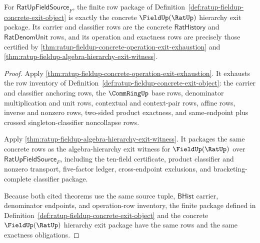 \begin{theorem}
\label{thm:ratup-fieldup-concrete-exit-object-hierarchy-exactness}
For $\mathsf{RatUpFieldSource}_F$, the finite row package of
Definition~\ref{def:ratup-fieldup-concrete-exit-object} is exactly the concrete
$\FieldUp(\RatUp)$ hierarchy exit package. Its carrier and classifier rows are
the concrete $\mathsf{RatHistory}$ and $\mathsf{RatDenomUnit}$ rows, and its
operation and exactness rows are precisely those certified by
\autoref{thm:ratup-fieldup-concrete-operation-exit-exhaustion} and
\autoref{thm:ratup-fieldup-algebra-hierarchy-exit-witness}.
\end{theorem}
\begin{proof}
Apply \autoref{thm:ratup-fieldup-concrete-operation-exit-exhaustion}. It
exhausts the row inventory of
Definition~\ref{def:ratup-fieldup-concrete-exit-object}: the carrier and
classifier anchoring rows, the $\CommRingUp$ base rows, denominator
multiplication and unit rows, contextual and context-pair rows, affine rows,
inverse and nonzero rows, two-sided product exactness, and same-endpoint plus
crossed singleton-classifier noncollapse rows.

Apply \autoref{thm:ratup-fieldup-algebra-hierarchy-exit-witness}. It packages
the same concrete rows as the algebra-hierarchy exit witness for
$\FieldUp(\RatUp)$ over $\mathsf{RatUpFieldSource}_F$, including the ten-field
certificate, product classifier and nonzero transport, five-factor ledger,
cross-endpoint exclusions, and bracketing-complete classifier package.

Because both cited theorems use the same source tuple, $\mathsf{BHist}$ carrier,
denominator endpoints, and operation-row inventory, the finite package defined
in Definition~\ref{def:ratup-fieldup-concrete-exit-object} and the concrete
$\FieldUp(\RatUp)$ hierarchy exit package have the same rows and the same
exactness obligations.
\end{proof}

